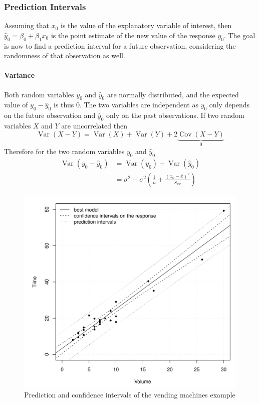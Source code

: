 \documentclass[11pt]{article}
\theoremstyle{definition}
\newcommand*\samplemean[1]{\overline{#1}}
\newcommand*\Cov[1]{\mathop{\text{Cov}}\left(#1\right)}
\newcommand*\Var[1]{\mathop{\text{Var}}\left(#1\right)}
\begin{document}
\subsubsection{Prediction Intervals}
Assuming that $x_0$ is the value of the explanatory variable of interest, then $\hat{y}_0 = \beta_0 + \beta_1 x_0$ is the point estimate of the new value of the response $y_0$. The goal is now to find a prediction interval for a future observation, considering the randomness of that observation as well.

\paragraph{Variance} Both random variables $y_0$ and $\hat{y}_0$ are normally distributed, and the expected value of $y_0 - \hat{y}_0$ is thus $0$. The two variables are independent as $y_0$ only depends on the future observation and $\hat{y}_0$ only on the past observations. If two random variables $X$ and $Y$ are uncorrelated then
\begin{equation*}
	\Var{X - Y} = \Var{X} + \Var{Y} + 2\underbrace{\Cov{X-Y}}_0
\end{equation*}
Therefore for the two random variables $y_0$ and $\hat{y}_0$
\begin{align*}
	\Var{y_0 - \hat{y}_0} &= \Var{y_0} + \Var{\hat{y}_0}\\
	&= \sigma^2 + \sigma^2\left(\frac{1}{n} + \frac{(x_0 - \samplemean{x})^2}{S_{xx}}\right)
\end{align*}

\begin{figure}[H]
	\centering
	\includegraphics[width=0.5\linewidth]{img/confidence_interval_response_prediction_interval_vending_machines}
	\caption{Prediction and confidence intervals of the vending machines example}
	\label{fig:confidenceintervalresponsepredictionintervalvendingmachines}
\end{figure}
\end{document}
